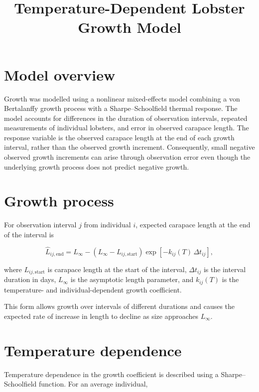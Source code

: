 \documentclass[11pt]{article}
\title{Temperature-Dependent Lobster Growth Model}
\author{}
\date{}
\begin{document}
\maketitle

\section{Model overview}

Growth was modelled using a nonlinear mixed-effects model combining a von Bertalanffy growth process with a Sharpe--Schoolfield thermal response. The model accounts for differences in the duration of observation intervals, repeated measurements of individual lobsters, and error in observed carapace length. The response variable is the observed carapace length at the end of each growth interval, rather than the observed growth increment. Consequently, small negative observed growth increments can arise through observation error even though the underlying growth process does not predict negative growth.

\section{Growth process}

For observation interval $j$ from individual $i$, expected carapace length at the end of the interval is

\begin{equation}
\widehat{L}_{ij,\mathrm{end}}
=
L_{\infty}
-
\left(L_{\infty}-L_{ij,\mathrm{start}}\right)
\exp\left[-k_{ij}(T)\,\Delta t_{ij}\right],
\end{equation}

where $L_{ij,\mathrm{start}}$ is carapace length at the start of the interval, $\Delta t_{ij}$ is the interval duration in days, $L_{\infty}$ is the asymptotic length parameter, and $k_{ij}(T)$ is the temperature- and individual-dependent growth coefficient.

This form allows growth over intervals of different durations and causes the expected rate of increase in length to decline as size approaches $L_{\infty}$.

\section{Temperature dependence}

Temperature dependence in the growth coefficient is described using a Sharpe--Schoolfield function. For an average individual,
\end{document}
